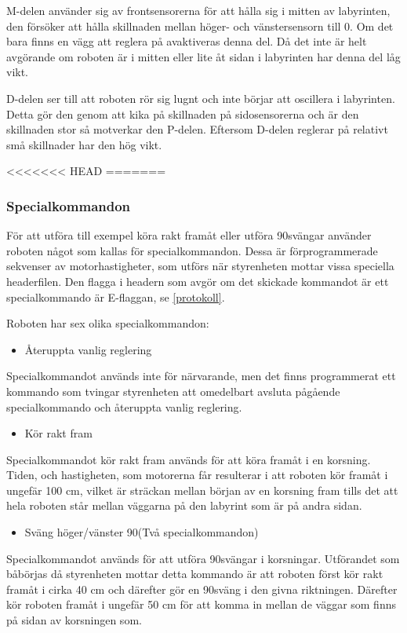M-delen använder sig av frontsensorerna för att hålla sig i mitten av
labyrinten, den försöker att hålla skillnaden mellan höger- och vänstersensorn
till 0. Om det bara finns en vägg att reglera på avaktiveras denna del. Då det
inte är helt avgörande om roboten är i mitten eller lite åt sidan i labyrinten
har denna del låg vikt.


D-delen ser till att roboten rör sig lugnt och inte börjar att oscillera i
labyrinten. Detta gör den genom att kika på skillnaden på sidosensorerna och är
den skillnaden stor så motverkar den P-delen. Eftersom D-delen reglerar på
relativt små skillnader har den hög vikt.
\label{reglering}

<<<<<<< HEAD
=======
\subsubsection{Specialkommandon}
För att utföra till exempel köra rakt framåt eller utföra 90\degree svängar använder
roboten något som kallas för specialkommandon. Dessa är förprogrammerade 
sekvenser av motorhastigheter, som utförs när styrenheten mottar vissa speciella
headerfilen. Den flagga i headern som avgör om det skickade kommandot är ett
specialkommando är E-flaggan, se \ref{protokoll}.

Roboten har sex olika specialkommandon:

 \begin{itemize}
\item Återuppta vanlig reglering
\end{itemize}
Specialkommandot används inte för närvarande, men det finns programmerat ett
kommando som tvingar styrenheten att omedelbart avsluta pågående specialkommando
och återuppta vanlig reglering.

\begin{itemize}
\item Kör rakt fram
\end{itemize}
Specialkommandot kör rakt fram används för att köra framåt i en korsning. Tiden, och hastigheten,
 som motorerna får resulterar i att roboten kör framåt  i ungefär 100 cm, vilket är sträckan mellan 
 början av en korsning fram tills det att hela roboten står mellan väggarna på den labyrint som är 
 på andra sidan.
 
 \begin{itemize}
\item Sväng höger/vänster 90\degree (Två specialkommandon) 
\end{itemize}
Specialkommandot används för att utföra 90\degree  svängar i korsningar. Utförandet som båbörjas
då styrenheten mottar detta kommando är att roboten först kör rakt framåt i cirka 40 cm och därefter
gör en 90\degree sväng i den givna riktningen. Därefter kör roboten framåt i ungefär 50 cm för 
att komma in mellan de väggar som finns på sidan av korsningen som.

